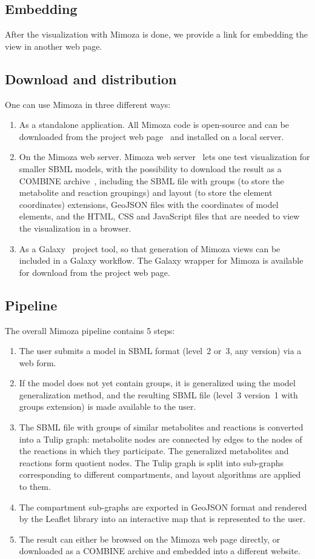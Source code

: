 \documentclass{bmcart}
\begin{document}
\subsection*{Embedding}
After the visualization with Mimoza is done, we provide a link for embedding the view in another web page.

\subsection*{Download and distribution}
   
One can use Mimoza in three different ways:
\begin{enumerate}
\item As a standalone application.
All Mimoza code is open-source and can be downloaded from the project web page~\cite{Zhukovaa} and installed on a local server.
\item On the Mimoza web server.
Mimoza web server~\cite{Zhukovaa} lets one test visualization for smaller SBML models, with the possibility to download the result as a COMBINE archive~\cite{Bergmann2014}, including the SBML file with groups (to store the metabolite and reaction groupings) and layout (to store the element coordinates) extensions, GeoJSON files with the coordinates of model elements, and the HTML, CSS and JavaScript files that are needed to view the visualization in a browser.
\item As a Galaxy~\cite{Blankenberg2010} project tool, so that generation of Mimoza views can be included in a Galaxy workflow.
The Galaxy wrapper for Mimoza is available for download from the project web page.
\end{enumerate}

 
\subsection*{Pipeline}
The overall Mimoza pipeline contains 5 steps:
\begin{enumerate}
\item The user submits a model in SBML format (level~2 or~3, any version) via a web form.
\item If the model does not yet contain groups, it is generalized using the model generalization method, and the resulting SBML file (level~3 version~1 with groups extension) is made available to the user.
\item The SBML file with groups of similar metabolites and reactions is converted into a Tulip graph: metabolite nodes are connected by edges to the nodes of the reactions in which they participate. The generalized metabolites and reactions form quotient nodes. The Tulip graph is split into sub-graphs corresponding to different compartments, and layout algorithms are applied to them.
\item The compartment sub-graphs are exported in GeoJSON format and rendered by the Leaflet library into an interactive map that is represented to the user.
\item The result can either be browsed on the Mimoza web page directly, or downloaded as a COMBINE archive and embedded into a different website.
\end{enumerate}
\end{document}
